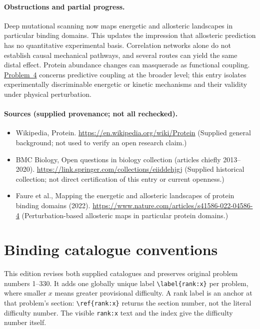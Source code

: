 \documentclass[11pt]{article}
\begin{document}
\paragraph{Obstructions and partial progress.} Deep mutational scanning now maps energetic and allosteric landscapes in particular binding domains. This updates the impression that allosteric prediction has no quantitative experimental basis. Correlation networks alone do not establish causal mechanical pathways, and several routes can yield the same distal effect. Protein abundance changes can masquerade as functional coupling. \href{https://we-solve.github.io/problems/quantitative-allostery-d179c700/}{Problem~4} concerns predictive coupling at the broader level; this entry isolates experimentally discriminable energetic or kinetic mechanisms and their validity under physical perturbation.
\paragraph{Sources (supplied provenance; not all rechecked).}
\begin{itemize}
\item Wikipedia, Protein. \url{https://en.wikipedia.org/wiki/Protein} (Supplied general background; not used to verify an open research claim.)
\item BMC Biology, Open questions in biology collection (articles chiefly 2013--2020). \url{https://link.springer.com/collections/eiiddehjgj} (Supplied historical collection; not direct certification of this entry or current openness.)
\item Faure et al., Mapping the energetic and allosteric landscapes of protein binding domains (2022). \url{https://www.nature.com/articles/s41586-022-04586-4} (Perturbation-based allosteric maps in particular protein domains.)
\end{itemize}


\section*{Binding catalogue conventions}
This edition revises both supplied catalogues and preserves original problem numbers 1--330. It adds one globally unique label \verb|\label{rank:x}| per problem, where smaller $x$ means greater provisional difficulty. A rank label is an anchor at that problem's section: \verb|\ref{rank:x}| returns the section number, not the literal difficulty number. The visible \texttt{rank:x} text and the index give the difficulty number itself.
\end{document}
